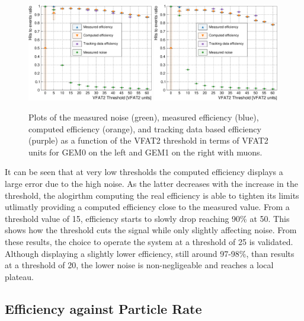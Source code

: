       \begin{figure}[h!]
        \centering
        \includegraphics[width=0.49\textwidth]{img/plots/cEfficiency_Threshold_GEM0-crop}
        \includegraphics[width=0.49\textwidth]{img/plots/cEfficiency_Threshold_GEM1-crop}
        \caption{Plots of the measured noise (green), measured efficiency (blue), computed efficiency (orange), and tracking data based efficiency (purple) as a function of the VFAT2 threshold in terms of VFAT2 units for GEM0 on the left and GEM1 on the right with muons.}
        \label{fig:II-3-data-eff-threshold}
      \end{figure}

      It can be seen that at very low thresholds the computed efficiency displays a large error due to the high noise. As the latter decreases with the increase in the threshold, the alogirthm computing the real efficiency is able to tighten its limits utlimatly providing a computed efficiency close to the measured value. From a threshold value of 15, efficiency starts to slowly drop reaching 90\% at 50. This shows how the threshold cuts the signal while only slightly affecting noise. From these results, the choice to operate the system at a threshold of 25 is validated. Although displaying a slightly lower efficiency, still around 97-98\%, than results at a threshold of 20, the lower noise is non-negligeable and reaches a local plateau.


    \subsection{Efficiency against Particle Rate}

